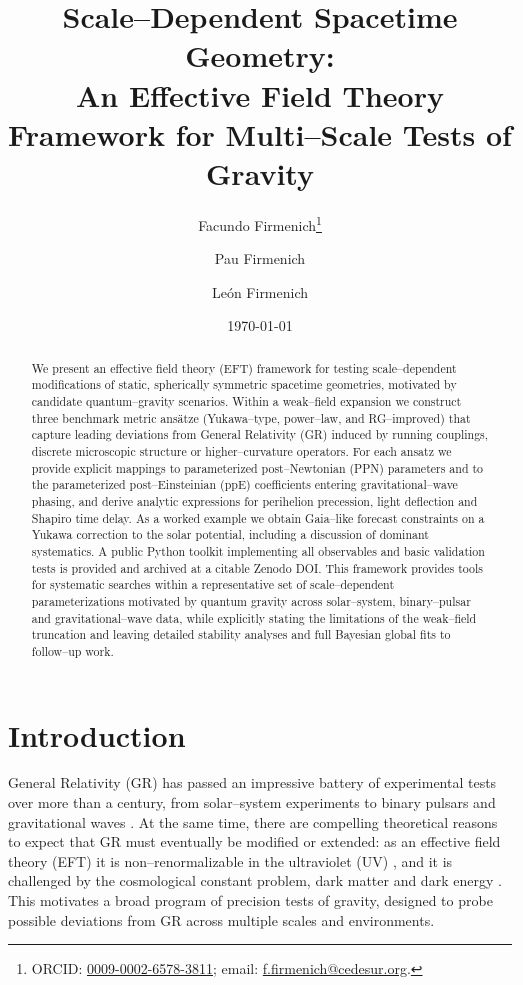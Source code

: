 \documentclass[11pt,a4paper]{article}
\title{\textbf{Scale--Dependent Spacetime Geometry:\\
An Effective Field Theory Framework for Multi--Scale Tests of Gravity}}
\author[1]{Facundo Firmenich\thanks{ORCID: \href{https://orcid.org/0009-0002-6578-3811}{0009-0002-6578-3811}; email: \href{mailto:f.firmenich@cedesur.org}{f.firmenich@cedesur.org}.}}
\author[1]{Pau Firmenich}
\author[1]{Le\'on Firmenich}
\affil[1]{Centro de Estudios del Sur (CEDESUR)}
\date{\today}
\begin{document}
\maketitle

\begin{abstract}
We present an effective field theory (EFT) framework for testing scale--dependent modifications of static, spherically symmetric spacetime geometries, motivated by candidate quantum--gravity scenarios. Within a weak--field expansion we construct three benchmark metric ans\"atze (Yukawa--type, power--law, and RG--improved) that capture leading deviations from General Relativity (GR) induced by running couplings, discrete microscopic structure or higher--curvature operators. For each ansatz we provide explicit mappings to parameterized post--Newtonian (PPN) parameters and to the parameterized post--Einsteinian (ppE) coefficients entering gravitational--wave phasing, and derive analytic expressions for perihelion precession, light deflection and Shapiro time delay. As a worked example we obtain Gaia--like forecast constraints on a Yukawa correction to the solar potential, including a discussion of dominant systematics. A public Python toolkit implementing all observables and basic validation tests is provided and archived at a citable Zenodo DOI. This framework provides tools for systematic searches within a representative set of scale--dependent parameterizations motivated by quantum gravity across solar--system, binary--pulsar and gravitational--wave data, while explicitly stating the limitations of the weak--field truncation and leaving detailed stability analyses and full Bayesian global fits to follow--up work.
\end{abstract}

\section{Introduction}
\label{sec:intro}

General Relativity (GR) has passed an impressive battery of experimental tests over more than a century, from solar--system experiments to binary pulsars and gravitational waves \cite{Will2014,Will2018}. At the same time, there are compelling theoretical reasons to expect that GR must eventually be modified or extended: as an effective field theory (EFT) it is non--renormalizable in the ultraviolet (UV) \cite{Donoghue1994,Burgess2004}, and it is challenged by the cosmological constant problem, dark matter and dark energy \cite{Clifton2012,Joyce2015}. This motivates a broad program of precision tests of gravity, designed to probe possible deviations from GR across multiple scales and environments.
\end{document}
